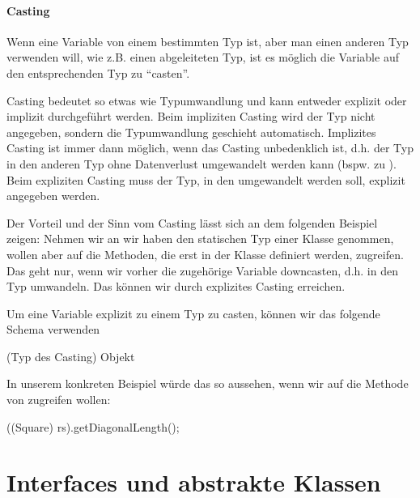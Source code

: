\documentclass{tuda-pub}
\begin{document}
  \paragraph{Casting}
  \label{sec:Casting}

  Wenn eine Variable von einem bestimmten Typ ist, aber man einen anderen Typ verwenden will, wie
  z.B. einen abgeleiteten Typ, ist es möglich die Variable auf den entsprechenden Typ zu
  \enquote{casten}.

  \br

  Casting bedeutet so etwas wie Typumwandlung und kann entweder explizit oder implizit
  durchgeführt werden. Beim impliziten Casting wird der Typ nicht angegeben, sondern die
  Typumwandlung geschieht automatisch. Implizites Casting ist immer dann möglich, wenn das
  Casting unbedenklich ist, d.h. der Typ in den anderen Typ ohne Datenverlust umgewandelt werden
  kann (bspw.  zu ). Beim expliziten Casting muss der Typ, in
  den umgewandelt werden soll, explizit angegeben werden.

  \br

  Der Vorteil und der Sinn vom Casting lässt sich an dem folgenden Beispiel zeigen: Nehmen wir an
  wir haben den statischen Typ einer Klasse  genommen, wollen aber auf die
  Methoden, die erst in der Klasse  definiert werden, zugreifen. Das geht nur,
  wenn wir vorher die zugehörige Variable downcasten, d.h. in den Typ 
  umwandeln. Das können wir durch explizites Casting erreichen.

  \br

  Um eine Variable explizit zu einem Typ zu casten, können wir das folgende Schema verwenden
  \begin{center}
  (Typ des Casting)
    Objekt
  \end{center}

  In unserem konkreten Beispiel würde das so aussehen, wenn wir auf die Methode
   von  zugreifen wollen:

  \begin{center}
    ((Square) rs).getDiagonalLength();
  \end{center}

  \clearpage


  \section{Interfaces und abstrakte Klassen}
  \label{sec:Interfaces_abstrakte_Klassen}
\end{document}
